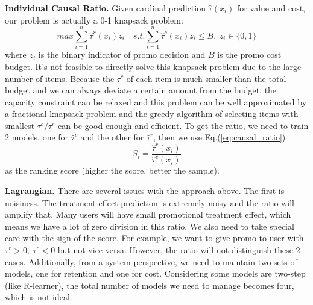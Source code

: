 \textbf{Individual Causal Ratio.} Given cardinal prediction $\hat\tau(x_i)$ for value and cost, our problem is actually a 0-1 knapsack problem:
\begin{equation}
  \label{eq:knapsack}
  max \sum_{i=1}^n\hat\tau^r(x_i)z_i \quad 
  s.t. \sum_{i=1}^n\hat\tau^c(x_i)z_i \leq B, \ z_i \in \{0, 1\}
\end{equation}
where $z_i$ is the binary indicator of promo decision and $B$ is the promo cost budget. It's not feasible to directly solve this knapsack problem due to the large number of items. Because the $\tau^c$ of each item is much smaller than the total budget and we can always deviate a certain amount from the budget, the capacity constraint can be relaxed and this problem can be well approximated by a fractional knapsack problem \cite{dantzig1957discrete} and the greedy algorithm of selecting items with smallest $\tau^c/\tau^r$ can be good enough and efficient. To get the ratio, we need to train 2 models, one for $\hat{\tau}^c$ and the other for $\hat{\tau}^r$, then we use Eq.(\ref{eq:causal_ratio})
\begin{equation}
  \label{eq:causal_ratio}
  S_i=\frac{\hat{\tau}^r(x_i)}{\hat{\tau}^c(x_i)}
\end{equation}
as the ranking score (higher the score, better the sample).

\textbf{Lagrangian.} There are several issues with the approach above. The first is noisiness. The treatment effect prediction is extremely noisy and the ratio will amplify that. Many users will have small promotional treatment effect, which means we have a lot of zero division in this ratio. We also need to take special care with the sign of the score. For example, we want to give promo to user with $\tau^r > 0, \ \tau^c < 0$ but not vice versa. However, the ratio will not distinguish these 2 cases. Additionally, from a system perspective, we need to maintain two sets of models, one for retention and one for cost. Considering some models are two-step (like R-learner), the total number of models we need to manage becomes four, which is not ideal.

